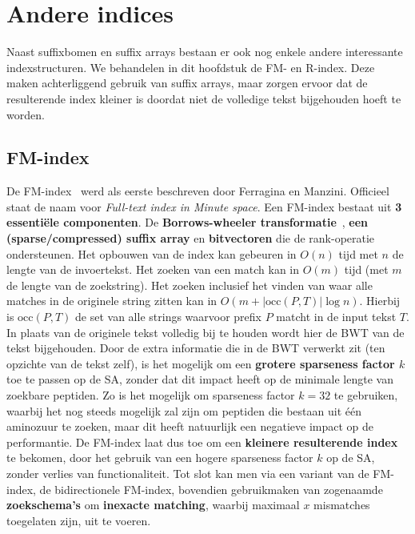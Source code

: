 \chapter{Andere indices}\label{ch:andere-indices}
Naast suffixbomen en suffix arrays bestaan er ook nog enkele andere interessante indexstructuren.
We behandelen in dit hoofdstuk de FM- en R-index.
Deze maken achterliggend gebruik van suffix arrays, maar zorgen ervoor dat de resulterende index kleiner is doordat niet de volledige tekst bijgehouden hoeft te worden.


\section{FM-index}\label{sec:fm-index}
De FM-index~\cite{fm_index} werd als eerste beschreven door Ferragina en Manzini.
Officieel staat de naam voor \textit{Full-text index in Minute space}.
Een FM-index bestaat uit \textbf{3 essentiële componenten}.
De \textbf{Borrows-wheeler transformatie}~\cite{bwt}, \textbf{een (sparse/compressed) suffix array} en \textbf{bitvectoren} die de rank-operatie ondersteunen.
Het opbouwen van de index kan gebeuren in $O(n)$ tijd met $n$ de lengte van de invoertekst.
Het zoeken van een match kan in $O(m)$ tijd (met $m$ de lengte van de zoekstring).
Het zoeken inclusief het vinden van waar alle matches in de originele string zitten kan in $O(m + \text{|occ}(P, T)\text{|} \log n)$.
Hierbij is $\text{occ}(P, T)$ de set van alle strings waarvoor prefix $P$ matcht in de input tekst $T$.
In plaats van de originele tekst volledig bij te houden wordt hier de BWT van de tekst bijgehouden.
Door de extra informatie die in de BWT verwerkt zit (ten opzichte van de tekst zelf), is het mogelijk om een \textbf{grotere sparseness factor $k$} toe te passen op de SA, zonder dat dit impact heeft op de minimale lengte van zoekbare peptiden.
Zo is het mogelijk om sparseness factor $k = 32$ te gebruiken, waarbij het nog steeds mogelijk zal zijn om peptiden die bestaan uit één aminozuur te zoeken, maar dit heeft natuurlijk een negatieve impact op de performantie.
De FM-index laat dus toe om een \textbf{kleinere resulterende index} te bekomen, door het gebruik van een hogere sparseness factor $k$ op de SA, zonder verlies van functionaliteit.
Tot slot kan men via een variant van de FM-index, de bidirectionele FM-index, bovendien gebruikmaken van zogenaamde \textbf{zoekschema's} om \textbf{inexacte matching}, waarbij maximaal $x$ mismatches toegelaten zijn, uit te voeren.

